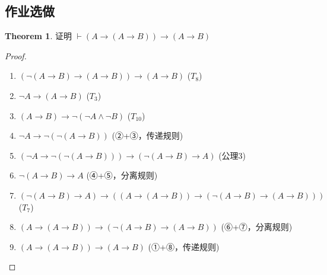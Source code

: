 \documentclass[oneside]{book}
\theoremstyle{definition}
\newtheorem{theorem}{Theorem}[section]
\begin{document}
\subsection{作业选做}
\begin{theorem}
	证明 \( \vdash (A\to (A\to B))\to (A\to B) \)
\end{theorem}
\begin{proof}
	\begin{enumerate}
		\item \((\neg(A\to B)\to (A\to B))\to (A\to B)\) \hfill (\(T_8\))
		\item \(\neg A\to (A\to B)\) \hfill (\(T_3\))
		\item \((A\to B)\to \neg(\neg A\land \neg B)\) \hfill (\(T_{10}\))
		\item \(\neg A\to \neg(\neg(A\to B))\) \hfill (②+③，传递规则)
		\item \((\neg A\to \neg(\neg(A\to B)))\to (\neg(A\to B)\to A)\) \hfill (公理3)
		\item \(\neg(A\to B)\to A\) \hfill (④+⑤，分离规则)
		\item \((\neg(A\to B)\to A)\to ((A\to (A\to B))\to (\neg(A\to B)\to (A\to B)))\) \hfill (\(T_7\))
		\item \((A\to (A\to B))\to (\neg(A\to B)\to (A\to B))\) \hfill (⑥+⑦，分离规则)
		\item \((A\to (A\to B))\to (A\to B)\) \hfill (①+⑧，传递规则)
	\end{enumerate}
\end{proof}
\end{document}
